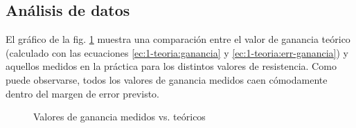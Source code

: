 \subsection{Análisis de datos}

El gráfico de la fig. \ref{fig:1-analisis:ganancia} muestra una comparación
entre el valor de ganancia teórico (calculado con las ecuaciones 
\ref{ec:1-teoria:ganancia} y \ref{ec:1-teoria:err-ganancia}) y aquellos 
medidos en la práctica para los distintos valores de resistencia. Como puede
observarse, todos los valores de ganancia medidos caen cómodamente dentro
del margen de error previsto.


\begin{figure}[H]
    \centering
    
    \caption{Valores de ganancia medidos vs. teóricos}
    \label{fig:1-analisis:ganancia}
\end{figure}


